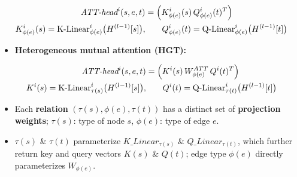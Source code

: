 \begin{align}
  \textit{ATT-head}^{i}(s,e,t) &= \Big(K^{i}_{\phi(e)}(s)\,Q^{i}_{\phi(e)}(t)^{T}\Big)
    \label{eq:lec09-first}\\
  K^{i}_{\phi(e)}(s) = \text{K-Linear}^{i}_{\phi(e)}\big(H^{(l-1)}[s]\big),&\qquad
  Q^{i}_{\phi(e)}(t) = \text{Q-Linear}^{i}_{\phi(e)}\big(H^{(l-1)}[t]\big)
    \notag
\end{align}
\begin{itemize}
  \item \textbf{Heterogeneous mutual attention (HGT):}
\end{itemize}
\begin{align}
  \textit{ATT-head}^{i}(s,e,t) &= \Big(K^{i}(s)\,W^{ATT}_{\phi(e)}\,Q^{i}(t)^{T}\Big)
    \label{eq:lec09-hgt-att}\\
  K^{i}(s) = \text{K-Linear}^{i}_{\tau(s)}\big(H^{(l-1)}[s]\big),&\qquad
  Q^{i}(t) = \text{Q-Linear}^{i}_{\tau(t)}\big(H^{(l-1)}[t]\big)
    \notag
\end{align}
\begin{itemize}
  \item Each \textbf{relation} $(\tau(s),\phi(e),\tau(t))$ has a distinct set of
    \textbf{projection weights}; $\tau(s)$: type of node $s$, $\phi(e)$: type of
    edge $e$.
  \item $\tau(s)$ \& $\tau(t)$ parameterize $K\_Linear_{\tau(s)}$ \&
    $Q\_Linear_{\tau(t)}$, which further return key and query vectors $K(s)$ \&
    $Q(t)$; edge type $\phi(e)$ directly parameterizes $W_{\phi(e)}$.
\end{itemize}

